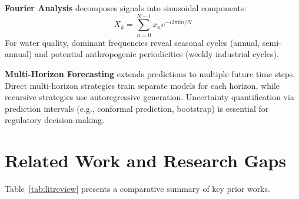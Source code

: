 \documentclass[12pt,a4paper]{report}
\numberwithin{table}{chapter}
\numberwithin{figure}{chapter}
\begin{document}
\textbf{Fourier Analysis} decomposes signals into sinusoidal components:
\begin{equation}
  X_k = \sum_{n=0}^{N-1} x_n e^{-i 2\pi k n / N}
\end{equation}
For water quality, dominant frequencies reveal seasonal cycles (annual, semi-annual)
and potential anthropogenic periodicities (weekly industrial cycles).

\textbf{Multi-Horizon Forecasting} extends predictions to multiple future time steps.
Direct multi-horizon strategies train separate models for each horizon, while
recursive strategies use autoregressive generation. Uncertainty quantification via
prediction intervals (e.g., conformal prediction, bootstrap) is essential for
regulatory decision-making.

\section{Related Work and Research Gaps}

Table~\ref{tab:litreview} presents a comparative summary of key prior works.
\end{document}
